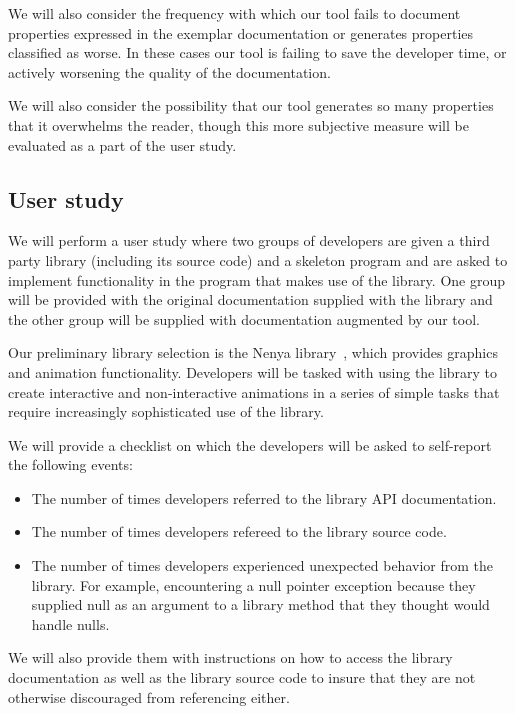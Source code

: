 We will also consider the frequency with which our tool fails to document
properties expressed in the exemplar documentation or generates properties
classified as worse. In these cases our tool is failing to save the developer
time, or actively worsening the quality of the documentation.

We will also consider the possibility that our tool generates so many
properties that it overwhelms the reader, though this more subjective measure
will be evaluated as a part of the user study.

\subsection{User study}

We will perform a user study where two groups of developers are given a third
party library (including its source code) and a skeleton program and are asked
to implement functionality in the program that makes use of the library. One
group will be provided with the original documentation supplied with the
library and the other group will be supplied with documentation augmented by
our tool.

Our preliminary library selection is the Nenya library~\cite{nenya}, which
provides graphics and animation functionality. Developers will be tasked with
using the library to create interactive and non-interactive animations in a
series of simple tasks that require increasingly sophisticated use of the
library.

We will provide a checklist on which the developers will be asked to
self-report the following events:

\begin{itemize}
\item The number of times developers referred to the library API documentation.
\item The number of times developers refereed to the library source code.
\item The number of times developers experienced unexpected behavior from the
  library. For example, encountering a null pointer exception because they
  supplied null as an argument to a library method that they thought would
  handle nulls.
\end{itemize}

We will also provide them with instructions on how to access the library
documentation as well as the library source code to insure that they are not
otherwise discouraged from referencing either.

